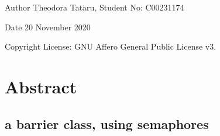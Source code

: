 \begin{DoxyAuthor}{Author}
Theodora Tataru, Student No\+: C00231174~\newline
 
\end{DoxyAuthor}
\begin{DoxyDate}{Date}
20 November 2020 
\end{DoxyDate}
\begin{DoxyCopyright}{Copyright}
License\+: G\+NU Affero General Public License v3. 
\end{DoxyCopyright}
\hypertarget{index_Abstract}{}\section{Abstract}\label{index_Abstract}
\hypertarget{index_Implementing}{}\subsection{a barrier class, using semaphores}\label{index_Implementing}
